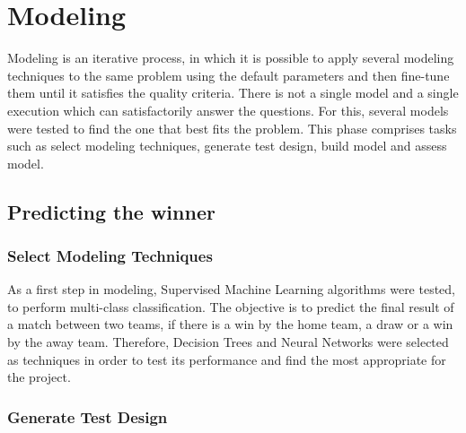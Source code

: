 \chapter{Modeling}
\label{cha:Modelling}

Modeling is an iterative process, in which it is possible to apply several modeling techniques to the same problem using the default parameters and then fine-tune them until it satisfies the quality criteria. There is not a single model and a single execution which can satisfactorily answer the questions. For this, several models were tested to find the one that best fits the problem.\newline \newline
This phase comprises tasks such as select modeling techniques, generate test design, build model and assess model.

\section{Predicting the winner}
\subsection{Select Modeling Techniques}

As a first step in modeling, Supervised Machine Learning algorithms were tested, to perform multi-class classification. The objective is to predict the final result of a match between two teams, if there is a win by the home team, a draw or a win by the away team. \newline \newline
Therefore, Decision Trees and Neural Networks were selected as techniques in order to test its performance and find the most appropriate for the project.

\subsection{Generate Test Design}

